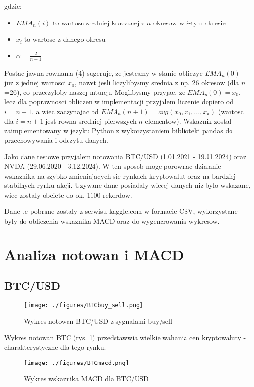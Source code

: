 \documentclass[a4paper,12pt]{article}  %
\begin{document}
gdzie:
\begin{itemize}
  \item $EMA_{n}(i)$ to wartosc sredniej kroczacej z $n$ okresow w $i$-tym okresie
  \item $x_i$ to wartosc z danego okresu
  \item $\alpha = \frac{2}{n+1}$
\end{itemize}


Postac jawna rownania (4) sugeruje, ze jestesmy w stanie obliczyc 
$EMA_{n}(0)$ juz z jednej wartosci $x_0$, nawet jesli liczylibysmy 
srednia z np. 26 okresow (dla $n$=26), co przeczyloby naszej intuicji.
Moglibysmy przyjac, ze $EMA_{n}(0) = x_0$, lecz dla poprawnosci obliczen
w implementacji przyjalem liczenie dopiero od $i = n+1$, a wiec zaczynajac od
$EMA_n(n+1) = avg(x_0, x_1, ..., x_n)$ (wartosc dla $i=n+1$ jest rowna sredniej pierwszych $n$
elementow).
Wskaznik zostal zaimplementowany w jezyku Python z wykorzystaniem biblioteki
pandas do przechowywania i odczytu danych. 

Jako dane testowe przyjalem notowania BTC/USD (1.01.2021 - 19.01.2024) oraz
NVDA (29.06.2020 - 3.12.2024). W ten sposob moge porownac dzialanie wskaznika
na szybko zmieniajacych sie rynkach kryptowalut oraz na bardziej stabilnych
rynku akcji. Uzywane dane posiadaly wiecej danych niz bylo wskazane, wiec 
zostaly obciete do ok. 1100 rekordow.

Dane te pobrane zostaly z serwisu kaggle.com w formacie CSV, wykorzystane byly 
do obliczenia wskaznika MACD oraz do wygenerowania wykresow. 

\pagebreak

\section{Analiza notowan i MACD}
\subsection{BTC/USD}

\begin{figure}[H]
  \centering
  \texttt{[image: ./figures/BTCbuy\_sell.png]}
  \caption{Wykres notowan BTC/USD z sygnalami buy/sell}
\end{figure}

Wykres notowan BTC (rys. 1) przedstawwia wielkie wahania cen kryptowaluty -
charakterystyczne dla tego rynku.

\begin{figure}[H]
  \centering
  \texttt{[image: ./figures/BTCmacd.png]}
  \caption{Wykres wskaznika MACD dla BTC/USD}
\end{figure}
\end{document}
